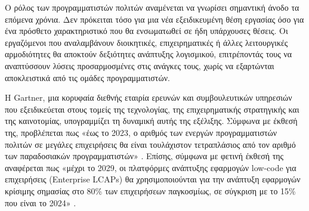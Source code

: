                 \begin{table}[H] \noindent\centering
                    \caption{\centering Διαφορές ανάμεσα στους προγραμματιστές πολίτες \\ και τους μηχανικούς λογισμικού}
                    \label{tab:devVScitdev}
                \end{table}

                Ο ρόλος των προγραμματιστών πολιτών αναμένεται να γνωρίσει σημαντική άνοδο τα επόμενα χρόνια. Δεν πρόκειται τόσο για μια νέα εξειδικευμένη θέση εργασίας όσο για ένα πρόσθετο χαρακτηριστικό που θα ενσωματωθεί σε ήδη υπάρχουσες θέσεις. Οι εργαζόμενοι που αναλαμβάνουν διοικητικές, επιχειρηματικές ή άλλες λειτουργικές αρμοδιότητες θα αποκτούν δεξιότητες ανάπτυξης λογισμικού, επιτρέποντάς τους να αναπτύσσουν λύσεις προσαρμοσμένες στις ανάγκες τους, χωρίς να εξαρτώνται αποκλειστικά από τις ομάδες προγραμματιστών.

                Η Gartner, μια κορυφαία διεθνής εταιρία ερευνών και συμβουλευτικών υπηρεσιών που εξειδικεύεται στους τομείς της τεχνολογίας, της επιχειρηματικής στρατηγικής και της καινοτομίας, υπογραμμίζει τη δυναμική αυτής της εξέλιξης. Σύμφωνα με έκθεσή της, προβλέπεται πως «έως το 2023, ο αριθμός των ενεργών προγραμματιστών πολιτών σε μεγάλες επιχειρήσεις θα είναι τουλάχιστον τετραπλάσιος από τον αριθμό των παραδοσιακών προγραμματιστών» \cite{GartnerReport}. Επίσης, σύμφωνα με φετινή έκθεσή της αναφέρεται πως «μέχρι το 2029, οι πλατφόρμες ανάπτυξης εφαρμογών low-code για επιχειρήσεις (Enterprise LCAPs) θα χρησιμοποιούνται για την ανάπτυξη εφαρμογών κρίσιμης σημασίας στο 80\% των επιχειρήσεων παγκοσμίως, σε σύγκριση με το 15\% που είναι το 2024» \cite{mendixGartnerQuadrant}.

